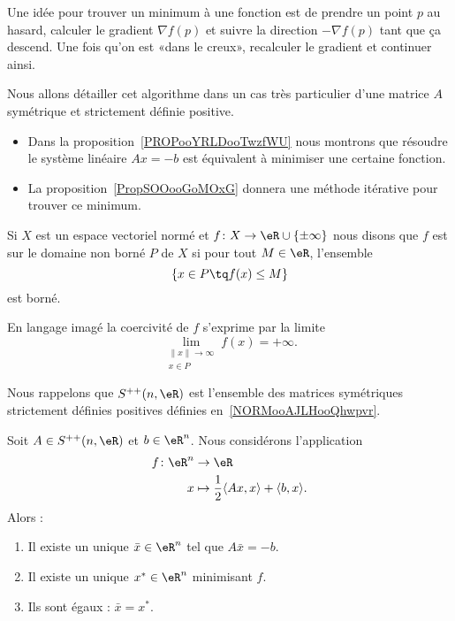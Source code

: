 Une idée pour trouver un minimum à une fonction est de prendre un point \( p\) au hasard, calculer le gradient \(\nabla f(p) \) et suivre la direction \(-\nabla f(p)\) tant que ça descend. Une fois qu'on est «dans le creux», recalculer le gradient et continuer ainsi.

Nous allons détailler cet algorithme dans un cas très particulier d'une matrice \( A\) symétrique et strictement définie positive.
\begin{itemize}
    \item Dans la proposition~\ref{PROPooYRLDooTwzfWU} nous montrons que résoudre le système linéaire \( Ax=-b\) est équivalent à minimiser une certaine fonction.
    \item La proposition~\ref{PropSOOooGoMOxG} donnera une méthode itérative pour trouver ce minimum.
\end{itemize}

\begin{definition}  \label{DefQXPooYSygGP}
    Si \( X\) est un espace vectoriel normé et \( f\colon X\to \eR\cup\{ \pm\infty \}\) nous disons que \( f\) est  sur le domaine non borné \( P\) de \( X\) si pour tout \( M\in \eR\), l'ensemble
    \begin{equation}
        \{ x\in P\tq f(x)\leq M \}
    \end{equation}
    est borné.
\end{definition}
En langage imagé la coercivité de \( f\) s'exprime par la limite
\begin{equation}
    \lim_{\substack{\| x \|\to \infty\\x\in P}}f(x)=+\infty.
\end{equation}


Nous rappelons que \( S^{++}(n,\eR)\) est l'ensemble des matrices symétriques strictement définies positives définies en~\ref{NORMooAJLHooQhwpvr}.
\begin{proposition}     \label{PROPooYRLDooTwzfWU}
    Soit \( A\in S^{++}(n,\eR)\) et \( b\in \eR^n\). Nous considérons l'application
    \begin{equation}
        \begin{aligned}
            f\colon \eR^n&\to \eR \\
            x&\mapsto \frac{ 1 }{2}\langle Ax, x\rangle +\langle b, x\rangle .
        \end{aligned}
    \end{equation}
    Alors :
    \begin{enumerate}
        \item
            Il existe un unique \( \bar x\in \eR^n\) tel que \( A\bar x=-b\).
        \item
            Il existe un unique \( x^*\in \eR^n\) minimisant \( f\).
        \item
            Ils sont égaux : \( \bar x=x^*\).
    \end{enumerate}
\end{proposition}

